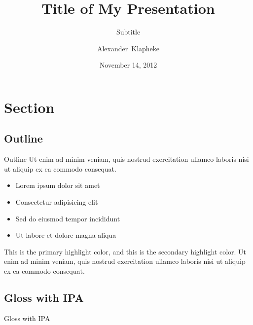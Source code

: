 \documentclass[xetex,serif,xcolor=x11names,compress]{beamer}
\title[Title]{Title of My Presentation}
\subtitle{Subtitle}
\author[Klapheke]{Alexander~Klapheke}
\institute[Harvard]{Harvard~University}
\date{November 14, 2012}
\newcommand\hla[1]{\textcolor{CustomRed}{#1}}
\newcommand\hlc[1]{\textcolor{CustomBlue}{#1}}
\begin{document}
\section{}
\begin{frame}
	\titlepage
\end{frame}

\section{Section}
\subsection{Outline}
\begin{frame}{Outline}
	Ut enim ad minim veniam, quis nostrud exercitation ullamco laboris nisi ut aliquip ex ea commodo consequat. \citep{aspects}
	\vfil
	\begin{itemize}
		\item Lorem ipsum dolor sit amet
		\item Consectetur adipisicing elit
		\item Sed do \hla{eiusmod tempor} incididunt
		\item Ut labore et dolore magna aliqua
	\end{itemize}
	\vfil
	This is the \hla{primary highlight color}, and this is the \hlc{secondary highlight color}.
	Ut enim ad minim veniam, quis nostrud exercitation ullamco laboris nisi ut aliquip ex ea commodo consequat.
\end{frame}

\subsection{Gloss with IPA}
\begin{frame}{Gloss with IPA}
	\vfil
	\begin{exe}
	\end{exe}
	\vfil
\end{frame}
\end{document}
